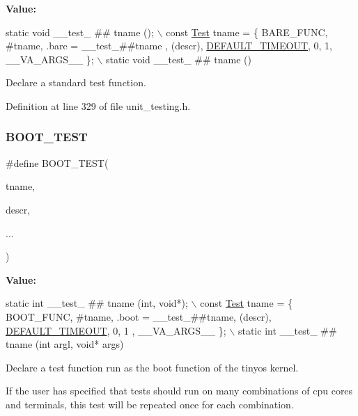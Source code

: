 {\bfseries Value\+:}
\begin{DoxyCode}
\textcolor{keyword}{static} \textcolor{keywordtype}{void} \_\_test\_ ## tname ();   \(\backslash\)
const \hyperlink{structTest}{Test} tname = \{ BARE\_FUNC, #tname, .bare = \_\_test\_##tname , (descr), 
      \hyperlink{group__Testing_gaad2dd72565852b91c809cd4685833b17}{DEFAULT\_TIMEOUT}, 0, 1, \_\_VA\_ARGS\_\_ \}; \(\backslash\)
static \textcolor{keywordtype}{void} \_\_test\_ ## tname ()
\end{DoxyCode}


Declare a standard test function. 



Definition at line 329 of file unit\+\_\+testing.\+h.

\mbox{\label{group__Testing_gadaaab439c094503b6ed7c313ad082f10}} 
\subsubsection{\texorpdfstring{B\+O\+O\+T\+\_\+\+T\+E\+ST}{BOOT\_TEST}}
{\footnotesize\ttfamily \#define B\+O\+O\+T\+\_\+\+T\+E\+ST(\begin{DoxyParamCaption}\item[{}]{tname,  }\item[{}]{descr,  }\item[{}]{... }\end{DoxyParamCaption})}

{\bfseries Value\+:}
\begin{DoxyCode}
\textcolor{keyword}{static} \textcolor{keywordtype}{int} \_\_test\_ ## tname (\textcolor{keywordtype}{int}, \textcolor{keywordtype}{void}*); \(\backslash\)
const \hyperlink{structTest}{Test} tname = \{ BOOT\_FUNC, #tname, .boot = \_\_test\_##tname, (descr), 
      \hyperlink{group__Testing_gaad2dd72565852b91c809cd4685833b17}{DEFAULT\_TIMEOUT}, 0, 1 , \_\_VA\_ARGS\_\_ \}; \(\backslash\)
static \textcolor{keywordtype}{int} \_\_test\_ ## tname (\textcolor{keywordtype}{int} argl, \textcolor{keywordtype}{void}* args)
\end{DoxyCode}


Declare a test function run as the boot function of the tinyos kernel. 

If the user has specified that tests should run on many combinations of cpu cores and terminals, this test will be repeated once for each combination. 

